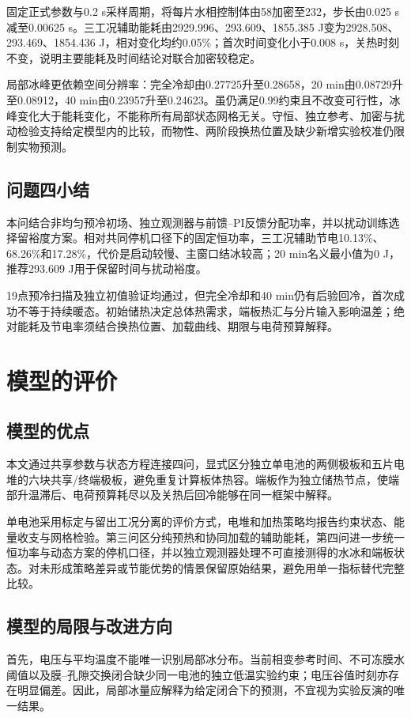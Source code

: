 \documentclass[bwprint]{gmcmthesis}
\numberwithin{equation}{section}
\numberwithin{figure}{section}
\begin{document}
固定正式参数与0.2 s采样周期，将每片水相控制体由58加密至232，步长由0.025 s减至0.00625 s。三工况辅助能耗由2929.996、293.609、1855.385 J变为2928.508、293.469、1854.436 J，相对变化均约0.05\%；首次时间变化小于0.008 s，关热时刻不变，说明主要能耗及时间结论对联合加密较稳定。

局部冰峰更依赖空间分辨率：完全冷却由0.27725升至0.28658，20 min由0.08729升至0.08912，40 min由0.23957升至0.24623。虽仍满足0.99约束且不改变可行性，冰峰变化大于能耗变化，不能称所有局部状态网格无关。守恒、独立参考、加密与扰动检验支持给定模型内的比较，而物性、两阶段换热位置及缺少新增实验校准仍限制实物预测。

\subsection{问题四小结}

本问结合非均匀预冷初场、独立观测器与前馈--PI反馈分配功率，并以扰动训练选择留裕度方案。相对共同停机口径下的固定恒功率，三工况辅助节电10.13\%、68.26\%和17.28\%，代价是启动较慢、主窗口结冰较高；20 min名义最小值为0 J，推荐293.609 J用于保留时间与扰动裕度。

19点预冷扫描及独立初值验证均通过，但完全冷却和40 min仍有后验回冷，首次成功不等于持续暖态。初始储热决定总体热需求，端板热汇与分片输入影响温差；绝对能耗及节电率须结合换热位置、加载曲线、期限与电荷预算解释。

\section{模型的评价}
\subsection{模型的优点}
本文通过共享参数与状态方程连接四问，显式区分独立单电池的两侧极板和五片电堆的六块共享/终端极板，避免重复计算板体热容。端板作为独立储热节点，使端部升温滞后、电荷预算耗尽以及关热后回冷能够在同一框架中解释。

单电池采用标定与留出工况分离的评价方式，电堆和加热策略均报告约束状态、能量收支与网格检验。第三问区分纯预热和协同加载的辅助能耗，第四问进一步统一恒功率与动态方案的停机口径，并以独立观测器处理不可直接测得的水冰和端板状态。对未形成策略差异或节能优势的情景保留原始结果，避免用单一指标替代完整比较。

\subsection{模型的局限与改进方向}
首先，电压与平均温度不能唯一识别局部冰分布。当前相变参考时间、不可冻膜水阈值以及膜--孔隙交换闭合缺少同一电池的独立低温实验约束；电压谷值时刻亦存在明显偏差。因此，局部冰量应解释为给定闭合下的预测，不宜视为实验反演的唯一结果。
\end{document}
